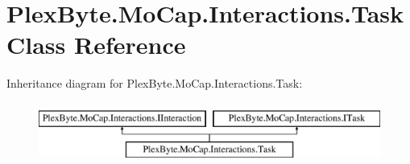 \hypertarget{class_plex_byte_1_1_mo_cap_1_1_interactions_1_1_task}{}\section{Plex\+Byte.\+Mo\+Cap.\+Interactions.\+Task Class Reference}
\label{class_plex_byte_1_1_mo_cap_1_1_interactions_1_1_task}
Inheritance diagram for Plex\+Byte.\+Mo\+Cap.\+Interactions.\+Task\+:\begin{figure}[H]
\begin{center}
\leavevmode
\includegraphics[height=2.000000cm]{class_plex_byte_1_1_mo_cap_1_1_interactions_1_1_task}
\end{center}
\end{figure}
